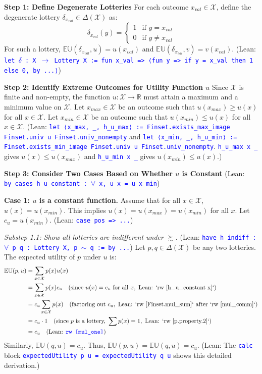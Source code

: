 \documentclass{article}
\theoremstyle{definition}
\newcommand{\R}{\mathbb{R}}
\newcommand{\X}{\mathcal{X}}
\newcommand{\EU}{\mathbb{EU}}
\newcommand{\tactic}[1]{\textcolor{blue}{\texttt{#1}}}
\newcommand{\DeltaX}{\Delta(\X)} %
\newcommand{\pref}{\succsim} %
\begin{document}
\textbf{Step 1: Define Degenerate Lotteries}
For each outcome $x_{val} \in \X$, define the degenerate lottery $\delta_{x_{val}} \in \DeltaX$ as:
\[ \delta_{x_{val}}(y) = \begin{cases} 1 & \text{if } y = x_{val} \\ 0 & \text{if } y \neq x_{val} \end{cases} \]
For such a lottery, $\EU(\delta_{x_{val}}, u) = u(x_{val})$ and $\EU(\delta_{x_{val}}, v) = v(x_{val})$.
(Lean:  \tactic{let $\delta$ : X $\rightarrow$ Lottery X := fun x\_val => ⟨fun y => if y = x\_val then 1 else 0, by ...⟩})

\textbf{Step 2: Identify Extreme Outcomes for Utility Function $u$}
Since $\X$ is finite and non-empty, the function $u: \X \to \R$ must attain a maximum and a minimum value on $\X$.
Let $x_{max} \in \X$ be an outcome such that $u(x_{max}) \ge u(x)$ for all $x \in \X$.
Let $x_{min} \in \X$ be an outcome such that $u(x_{min}) \le u(x)$ for all $x \in \X$.
(Lean: \tactic{let ⟨x\_max, \_, h\_u\_max⟩ := Finset.exists\_max\_image Finset.univ u Finset.univ\_nonempty} and \tactic{let ⟨x\_min, \_, h\_u\_min⟩ := Finset.exists\_min\_image Finset.univ u Finset.univ\_nonempty}. \tactic{h\_u\_max x \_} gives $u(x) \le u(x_{max})$ and \tactic{h\_u\_min x \_} gives $u(x_{min}) \le u(x)$.)

\textbf{Step 3: Consider Two Cases Based on Whether $u$ is Constant}
(Lean: \tactic{by\_cases h\_u\_constant : $\forall$ x, u x = u x\_min})

\textbf{Case 1: $u$ is a constant function.}
Assume that for all $x \in \X$, $u(x) = u(x_{min})$. This implies $u(x) = u(x_{max}) = u(x_{min})$ for all $x$. Let $c_u = u(x_{min})$.
(Lean: \tactic{case pos => ...})

    \textit{Substep 1.1: Show all lotteries are indifferent under $\pref$.}
    (Lean: \tactic{have h\_indiff : $\forall$ p q : Lottery X, p $\sim$ q := by ...})
    Let $p, q \in \DeltaX$ be any two lotteries.
    The expected utility of $p$ under $u$ is:
    \begin{align*}
        \EU(p, u) &= \sum_{x \in \X} p(x)u(x) \\
        &= \sum_{x \in \X} p(x)c_u \quad (\text{since } u(x) = c_u \text{ for all } x, \text{ Lean: `rw [h\_u\_constant x]`}) \\
        &= c_u \sum_{x \in \X} p(x) \quad (\text{factoring out } c_u, \text{ Lean: `rw [Finset.mul\_sum]` after `rw [mul\_comm]`}) \\
        &= c_u \cdot 1 \quad (\text{since } p \text{ is a lottery, } \sum p(x) = 1, \text{ Lean: `rw [p.property.2]`}) \\
        &= c_u \quad (\text{Lean: \tactic{rw [mul\_one]}})
    \end{align*}
    Similarly, $\EU(q, u) = c_u$.
    Thus, $\EU(p, u) = \EU(q, u) = c_u$.
    (Lean: The \tactic{calc} block \tactic{expectedUtility p u = expectedUtility q u} shows this detailed derivation.)
\end{document}
